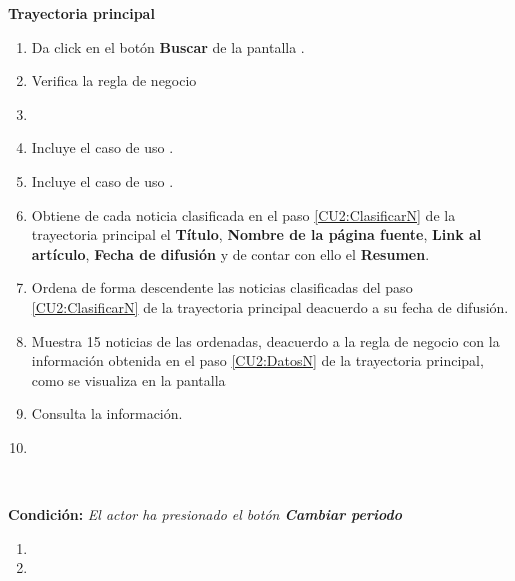 \begin{large}
\textbf{Trayectoria principal}\\
\end{large}	

\begin{enumerate}[1.]

\item \actor Da click en el botón \textbf{Buscar} de la pantalla . 

\item \sistema Verifica la regla de negocio 

\item \sistema 

\item \sistema Incluye el caso de uso .

\item \sistema \label{CU2:ClasificarN}Incluye el caso de uso .

\item \sistema \label{CU2:DatosN}Obtiene de cada noticia clasificada en el paso \ref{CU2:ClasificarN} de la trayectoria principal el \textbf{Título}, \textbf{Nombre de la página fuente}, \textbf{Link al artículo}, \textbf{Fecha de difusión} y de contar con ello el \textbf{Resumen}.

\item \sistema \label{CU2:OrdenaN}Ordena de forma descendente las noticias clasificadas del paso \ref{CU2:ClasificarN} de la trayectoria principal deacuerdo a su fecha de difusión.

\item \sistema Muestra 15 noticias de las ordenadas, deacuerdo a la regla de negocio  con la información obtenida en el paso \ref{CU2:DatosN} de la trayectoria principal, como se visualiza en la pantalla  

\item \actor \label{CU2:Consulta}Consulta la información.

\item \finCU	
\end{enumerate}


\begin{large}
\\
\end{large}	
\textbf{Condición:} \textit{El actor ha presionado el botón \textbf{Cambiar periodo}}

\begin{enumerate}[{A-}1.]

\item \sistema 
\item \finCU	

\end{enumerate}



